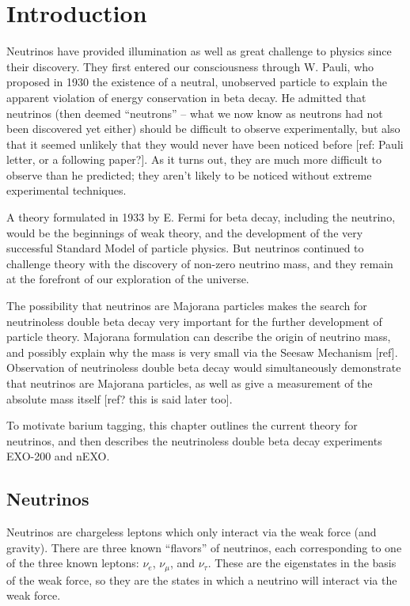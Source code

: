 \chapter{Introduction}

Neutrinos have provided illumination as well as great challenge to physics since their discovery.  They first entered our consciousness through W. Pauli, who proposed in 1930 the existence of a neutral, unobserved particle to explain the apparent violation of energy conservation in beta decay. He admitted that neutrinos (then deemed ``neutrons'' -- what we now know as neutrons had not been discovered yet either) should be difficult to observe experimentally, but also that it seemed unlikely that they would never have been noticed before [ref: Pauli letter, or a following paper?].  As it turns out, they are much more difficult to observe than he predicted; they aren't likely to be noticed without extreme experimental techniques.

A theory formulated in 1933 by E. Fermi for beta decay, including the neutrino, would be the beginnings of weak theory, and the development of the very successful Standard Model of particle physics.  But neutrinos continued to challenge theory with the discovery of non-zero neutrino mass, and they remain at the forefront of our exploration of the universe.

The possibility that neutrinos are Majorana particles makes the search for neutrinoless double beta decay very important for the further development of particle theory.  Majorana formulation can describe the origin of neutrino mass, and possibly explain why the mass is very small via the Seesaw Mechanism [ref].  Observation of neutrinoless double beta decay would simultaneously demonstrate that neutrinos are Majorana particles, as well as give a measurement of the absolute mass itself [ref? this is said later too].

To motivate barium tagging, this chapter outlines the current theory for neutrinos, and then describes the neutrinoless double beta decay experiments EXO-200 and nEXO.

\section{Neutrinos}

Neutrinos are chargeless leptons which only interact via the weak force (and gravity).  There are three known ``flavors'' of neutrinos, each corresponding to one of the three known leptons:  $\nu_{e}$, $\nu_{\mu}$, and $\nu_{\tau}$.  These are the eigenstates in the basis of the weak force, so they are the states in which a neutrino will interact via the weak force.

